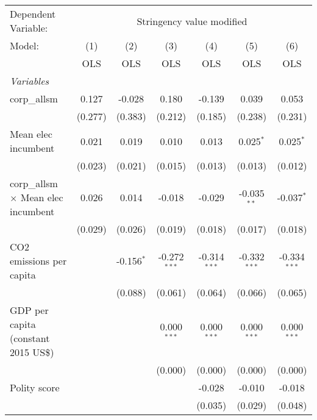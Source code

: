 
\begingroup
\centering
\begin{tabular}{lcccccc}
   \toprule
   Dependent Variable: & \multicolumn{6}{c}{Stringency value modified}\\
   Model:                                     & (1)     & (2)          & (3)            & (4)            & (5)            & (6)\\  
                                              &  OLS    & OLS          & OLS            & OLS            & OLS            & OLS\\  
   \midrule
   \emph{Variables}\\
   corp\_allsm                                & 0.127   & -0.028       & 0.180          & -0.139         & 0.039          & 0.053\\   
                                              & (0.277) & (0.383)      & (0.212)        & (0.185)        & (0.238)        & (0.231)\\   
   Mean elec incumbent                        & 0.021   & 0.019        & 0.010          & 0.013          & 0.025$^{*}$    & 0.025$^{*}$\\   
                                              & (0.023) & (0.021)      & (0.015)        & (0.013)        & (0.013)        & (0.012)\\   
   corp\_allsm $\times$ Mean elec incumbent   & 0.026   & 0.014        & -0.018         & -0.029         & -0.035$^{**}$  & -0.037$^{*}$\\   
                                              & (0.029) & (0.026)      & (0.019)        & (0.018)        & (0.017)        & (0.018)\\   
   CO2 emissions per capita                   &         & -0.156$^{*}$ & -0.272$^{***}$ & -0.314$^{***}$ & -0.332$^{***}$ & -0.334$^{***}$\\   
                                              &         & (0.088)      & (0.061)        & (0.064)        & (0.066)        & (0.065)\\   
   GDP per capita (constant 2015 US\$)        &         &              & 0.000$^{***}$  & 0.000$^{***}$  & 0.000$^{***}$  & 0.000$^{***}$\\   
                                              &         &              & (0.000)        & (0.000)        & (0.000)        & (0.000)\\   
   Polity score                               &         &              &                & -0.028         & -0.010         & -0.018\\   
                                              &         &              &                & (0.035)        & (0.029)        & (0.048)\\   

\end{tabular}
